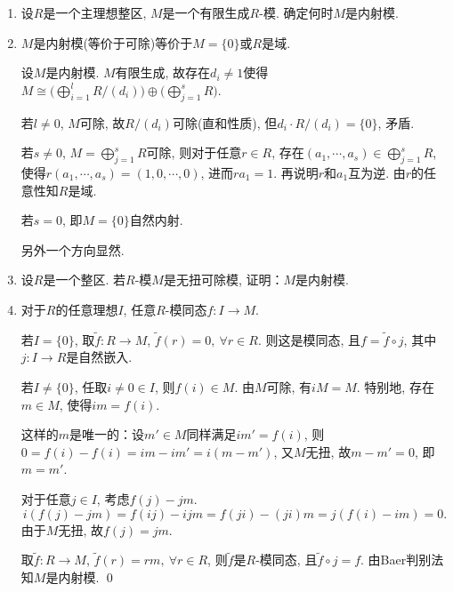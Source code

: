 \begin{enumerate}
        \item[7.4] 设$R$是一个主理想整区, $M$是一个有限生成$R$-模. 确定何时$M$是内射模.
        \item[\textbf{证明:}] 
            $M$是内射模(等价于可除)等价于$M=\{0\}$或$R$是域.\par
            设$M$是内射模. $M$有限生成, 故存在$d_i\neq 1$使得
            $M\cong \Big(\bigoplus\limits_{i=1}^l R/(d_i)\Big)
            \oplus \Big(\bigoplus\limits_{j=1}^s R\Big)$. \par
            若$l\neq 0$, $M$可除, 故$R/(d_i)$可除(直和性质), 
            但$d_i\cdot R/(d_i)=\{0\}$, 矛盾.\par
            若$s\neq 0$, $M=\bigoplus\limits_{j=1}^s R$可除, 则对于任意$r\in R$, 
            存在$(a_1,\cdots,a_s)\in \bigoplus\limits_{j=1}^s R$, 
            使得$r(a_1,\cdots,a_s)=(1,0,\cdots,0)$, 进而$ra_1=1$. 
            再说明$r$和$a_1$互为逆. 由$r$的任意性知$R$是域.\par
            若$s=0$, 即$M=\{0\}$自然内射.\par
            另外一个方向显然.

        \item[7.5] 设$R$是一个整区. 若$R$-模$M$是无扭可除模, 证明：$M$是内射模.\par
        \item[\textbf{证明:}]  
            对于$R$的任意理想$I$, 任意$R$-模同态$f:I\rightarrow M$.\par
            若$I=\{0\}$, 取$\tilde{f}:R\rightarrow M$, 
            $\tilde{f}(r)=0,\ \forall r\in R$. 则这是模同态, 
            且$f=\tilde{f}\circ j$, 其中$j:I\rightarrow R$是自然嵌入.\par
            若$I\neq \{0\}$, 任取$i\neq 0 \in I$, 则$f(i)\in M$.
            由$M$可除, 有$iM=M$. 特别地, 存在$m\in M$, 使得$im=f(i)$.\par
            这样的$m$是唯一的：设$m'\in M$同样满足$im'=f(i)$, 
            则$0=f(i)-f(i)=im-im'=i(m-m')$, 又$M$无扭, 故$m-m'=0$, 即$m=m'$.\par
            对于任意$j\in I$, 考虑$f(j)-jm$. 
            $$i(f(j)-jm)=f(ij)-ijm=f(ji)-(ji)m=j(f(i)-im)=0.$$
            由于$M$无扭, 故$f(j)=jm$.\par
            取$\tilde{f}:R\rightarrow M$, $\tilde{f}(r)=rm,\ \forall r\in R$, 
            则$\tilde{f}$是$R$-模同态, 且$\tilde{f}\circ j=f$.
            由Baer判别法知$M$是内射模. \qed


\end{enumerate}

